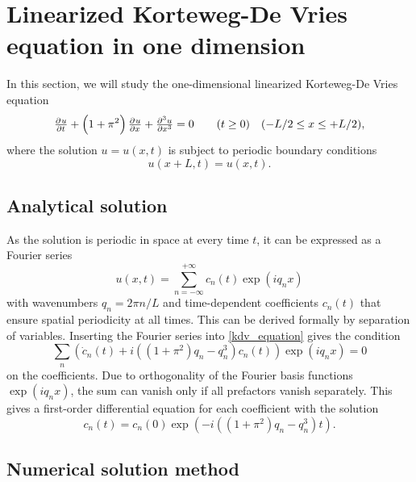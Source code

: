 \section{Linearized Korteweg-De Vries equation in one dimension}

In this section, we will study the one-dimensional linearized Korteweg-De Vries equation
\begin{equation}
\pd{u}{t} + \left(1+\pi^2\right)\pd{u}{x} + \pd[3]{u}{x} = 0 \qquad (t \geq 0) \quad (-L/2 \leq x \leq +L/2),
\label{kdv_equation}
\end{equation}
where the solution $u = u(x,t)$ is subject to periodic boundary conditions
\begin{equation*}
u(x+L, t) = u(x, t).
\end{equation*}

\subsection{Analytical solution}

As the solution is periodic in space at every time $t$, it can be expressed as a Fourier series
\begin{equation}
u(x, t) = \sum_{n=-\infty}^{+\infty} c_n(t) \exp{(i q_n x)}
\label{fourier_series}
\end{equation}
with wavenumbers $q_n = 2 \pi n / L$ and time-dependent coefficients $c_n(t)$ that ensure spatial periodicity at all times.
This can be derived formally by separation of variables.
Inserting the Fourier series into \cref{kdv_equation} gives the condition
\begin{equation*}
	\sum_n \left( \dot{c}_n(t) + i \left( \left( 1+\pi^2 \right) q_n - q_n^3 \right) c_n(t) \right) \exp{(i q_n x)} = 0
\end{equation*}
on the coefficients.
Due to orthogonality of the Fourier basis functions $\exp(i q_n x)$, the sum can vanish only if all prefactors vanish separately.
This gives a first-order differential equation for each coefficient with the solution
\begin{equation}
	c_n(t) = c_n(0) \exp{\left( -i \left (\left(1+\pi^2\right)q_n - q_n^3\right) t \right) }.
	\label{fourier_coefficients}
\end{equation}

\subsection{Numerical solution method}

